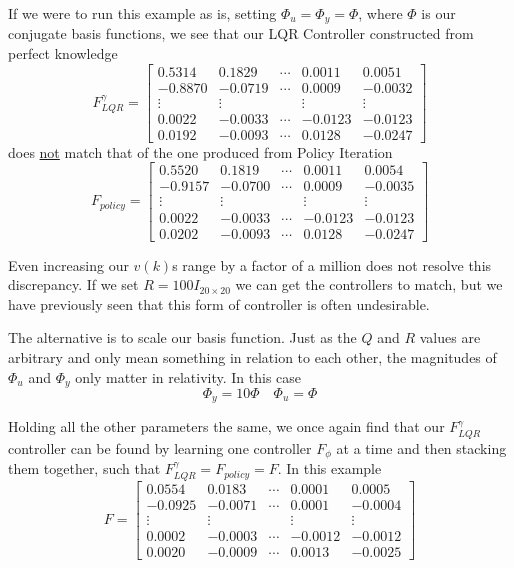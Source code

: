 If we were to run this example as is, setting $\Phi_u = \Phi_y = \Phi$, where $\Phi$ is our conjugate basis functions, we see that our LQR Controller constructed from perfect knowledge
\begin{equation}
    F_{LQR}^\gamma = 
    \begin{bmatrix}
        0.5314  &  0.1829 & \cdots & 0.0011 &   0.0051\\
        -0.8870 &  -0.0719  & \cdots &  0.0009 &  -0.0032\\
        \vdots & \vdots & & \vdots & \vdots \\
        0.0022 &  -0.0033 & \cdots &  -0.0123 &  -0.0123\\
        0.0192 &  -0.0093  & \cdots &  0.0128 &  -0.0247
    \end{bmatrix}
\end{equation}
does \underline{not} match that of the one produced from Policy Iteration
\begin{equation}
    F_{policy} = 
    \begin{bmatrix}
        0.5520  &  0.1819 & \cdots &   0.0011 &   0.0054\\
        -0.9157 &  -0.0700 & \cdots &   0.0009 &  -0.0035\\
        \vdots & \vdots & & \vdots & \vdots \\
         0.0022 &  -0.0033 & \cdots &  -0.0123 &  -0.0123\\
         0.0202 &  -0.0093  & \cdots &  0.0128 &  -0.0247
    \end{bmatrix}
\end{equation}

Even increasing our $v(k)$s range by a factor of a million does not resolve this discrepancy. If we set $R = 100I_{20 \times 20}$ we can get the controllers to match, but we have previously seen that this form of controller is often undesirable.

The alternative is to scale our basis function. Just as the $Q$ and $R$ values are arbitrary and only mean something in relation to each other, the magnitudes of $\Phi_u$ and $\Phi_y$ only matter in relativity. In this case
\begin{equation}
    \Phi_y = 10\Phi
    \quad
    \Phi_u = \Phi
\end{equation}

Holding all the other parameters the same, we once again find that our $F_{LQR}^\gamma$ controller can be found by learning one controller $F_\phi$ at a time and then stacking them together, such that $F_{LQR}^\gamma = F_{policy} = F$.  In this example
\begin{equation}
    F
    = 
    \begin{bmatrix}
        0.0554  &  0.0183 & \cdots &   0.0001 &   0.0005\\
        -0.0925 &  -0.0071 & \cdots &   0.0001 &  -0.0004\\
        \vdots & \vdots & & \vdots & \vdots \\
        0.0002 &  -0.0003 & \cdots &  -0.0012 &  -0.0012\\
        0.0020 &  -0.0009  & \cdots &  0.0013 &  -0.0025
    \end{bmatrix}
\end{equation}

